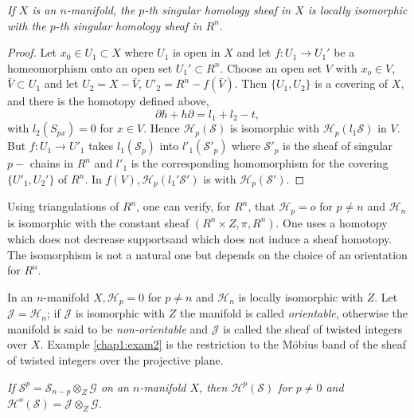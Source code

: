  \textit{If $X$ is an $n$-manifold, the $p$-th singular homology sheaf 
  in $X$ is locally isomorphic with the $p$-th singular homology sheaf
  in $R^n$}. 

\begin{proof}
Let $x_0 \in U_1 \subset X$ where $U_1$ is open in $X$ and let $f :
U_1 \rightarrow U_1'$ be a homeomorphism onto an open set $U_1'
\subset R^n$. Choose an open set $V$ with $x_o \in V$, $\bar{V} \subset
U_1$ and let $U_2 = X - \bar{V}$, $U'_2 = R^n - f(\bar{V})$. Then
$\{U_1,U_2 \}$ is a covering of $X$, and there is the homotopy defined
above,  
$$
\partial  h + h  \partial = l_1 + l_2 -t,
$$
with $l_2(S_{px}) = 0$ for $x \in V$. Hence
$\mathscr{H}_{p}(\mathscr{S})$ is isomorphic with $\mathscr{H}_p
(l_1\mathscr{S})$ in $V$. But $f : U_1 \rightarrow U'_1$ takes
$l_1(\mathscr{S}_p)$ into $l'_1(\mathscr{S}'_p)$ where
$\mathscr{S}'_p$ is the sheaf of singular $p-$ chains in $R^n$ and $l'_1$
is the corresponding homomorphism for the covering $\{U'_1, U_2' \}$
of $R^n$. In $f(V),\mathscr{H}_p(l_1' \mathscr{S}')$ is with
$\mathscr{H}_p(\mathscr{S}')$. 
\end{proof}

Using triangulations of $R^n$, one can verify, for $R^n$, that
$\mathscr{H}_p = o$ for $p \neq n $ and $\mathscr{H}_n$ is isomorphic
with the constant sheaf $(R^n \times Z, \pi, R^n)$. One uses a
homotopy which does not decrease supports\pageoriginale and which does
not induce a sheaf homotopy. The isomorphism is not a natural one but
depends on the choice of an orientation for $R^n$.  

In an $n$-manifold $X, \mathscr{H}_p = 0$ for $p \neq n$ and
$\mathscr{H}_n$ is locally isomorphic with $Z$. Let $\mathcal{J} =
\mathscr{H}_n$; if $\mathcal{J}$ is isomorphic with $Z$ the manifold
is called \textit{orientable}, otherwise the manifold is said to be
\textit{non-orientable} and $\mathcal{J}$ is called the sheaf of
twisted integers over $X$. Example \ref{chap1:exam2} is the restriction to the 
M\"obius band of the sheaf of twisted integers over the projective
plane. 

\textit{If $\mathscr{S}^p = \mathscr{S}_{n-p}\otimes_Z \mathscr{G}$ on
  an $n$-manifold $X$, then $\mathscr{H}^p (\mathscr{S})$ for $p \neq 0$
  and $\mathscr{H}^o(\mathscr{S}) = \mathcal{J}\otimes_Z
  \mathscr{G}$}. 

